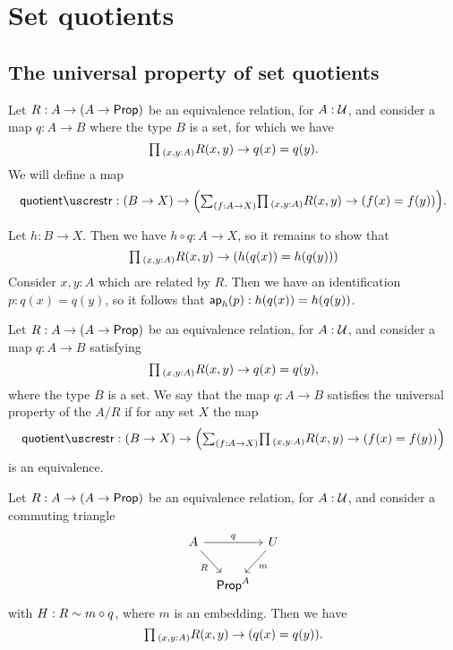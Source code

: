 \section{Set quotients}

\subsection{The universal property of set quotients}

\begin{defn}
Let $R:A\to (A\to \mathsf{Prop})$ be an equivalence relation, for $A:\mathcal{U}$, and consider a map $q:A\to B$ where the type $B$ is a set, for which we have
\begin{equation*}
\prd{x,y:A}R(x,y)\to q(x)=q(y).
\end{equation*}
We will define a map
\begin{equation*}
\quotientrestr:(B\to X) \to \Big(\sm{f:A\to X}\prd{x,y:A}R(x,y)\to (f(x)=f(y))\Big).
\end{equation*}
\end{defn}

\begin{constr}
Let $h:B\to X$. Then we have $h\circ q : A\to X$, so it remains to show that
\begin{equation*}
\prd{x,y:A}R(x,y)\to (h(q(x))=h(q(y)))
\end{equation*}
Consider $x,y:A$ which are related by $R$. Then we have an identification $p:q(x)=q(y)$, so it follows that $\mathsf{ap}_{h}({p}):h(q(x))=h(q(y))$.  
\end{constr}

\begin{defn}
Let $R:A\to (A\to \mathsf{Prop})$ be an equivalence relation, for $A:\mathcal{U}$, and consider a map $q:A\to B$ satisfying
\begin{equation*}
\prd{x,y:A}R(x,y)\to q(x)=q(y),
\end{equation*}
where the type $B$ is a set. We say that the map $q:A\to B$ satisfies the universal property of the  $A/R$ if for any set $X$ the map
\begin{equation*}
\quotientrestr : (B\to X) \to \Big(\sm{f:A\to X}\prd{x,y:A}R(x,y)\to (f(x)=f(y))\Big)
\end{equation*}
is an equivalence.
\end{defn}

\begin{lem}
Let $R:A\to (A\to \mathsf{Prop})$ be an equivalence relation, for $A:\mathcal{U}$, and consider a commuting triangle
\begin{equation*}
\begin{tikzcd}[column sep=tiny]
A \arrow[rr,"q"] \arrow[dr,swap,"R"] & & U \arrow[dl,"m"] \\
& \prop^A
\end{tikzcd}
\end{equation*}
with $H:R\sim m\circ q$, where $m$ is an embedding. Then we have
\begin{equation*}
\prd{x,y:A}R(x,y)\to (q(x)=q(y)).
\end{equation*}
\end{lem}

